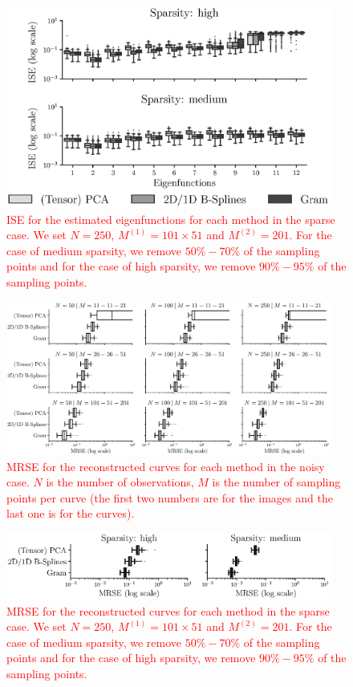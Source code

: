 \begin{figure}
     \centering
    \includegraphics[width=0.95\textwidth]{figures/ISE_sparse.eps}
    \caption{\textcolor{red}{ISE for the estimated eigenfunctions for each method in the sparse case. We set $N = 250$, $M^{(1)} = 101 \times 51$ and $M^{(2)} = 201$. For the case of medium sparsity, we remove $50\%-70\%$ of the sampling points and for the case of high sparsity, we remove $90\%-95\%$ of the sampling points.}}
    \label{fig:ise_mfd_1d_sparse}
\end{figure}


\begin{figure}
     \centering
     \includegraphics[width=0.95\textwidth]{figures/MRSE_noise.eps}
    \caption{\textcolor{red}{MRSE for the reconstructed curves for each method in the noisy case. $N$ is the number of observations, $M$ is the number of sampling points per curve (the first two numbers are for the images and the last one is for the curves).}}
    \label{fig:mise_mfd_1d_noise}
\end{figure}

\begin{figure}
     \centering
     \includegraphics[width=0.95\textwidth]{figures/MRSE_sparse.eps}
    \caption{\textcolor{red}{MRSE for the reconstructed curves for each method in the sparse case. We set $N = 250$, $M^{(1)} = 101 \times 51$ and $M^{(2)} = 201$. For the case of medium sparsity, we remove $50\%-70\%$ of the sampling points and for the case of high sparsity, we remove $90\%-95\%$ of the sampling points.}}
    \label{fig:mise_mfd_1d_sparse}
\end{figure}

